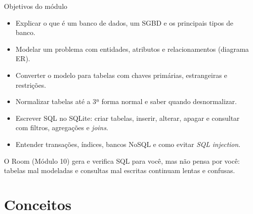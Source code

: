 \documentclass[aspectratio=169,10pt]{beamer}
\begin{document}
\capa

\begin{frame}{Objetivos do módulo}
  \begin{conceito}
    \begin{itemize}
      \item Explicar o que é um banco de dados, um SGBD e os principais tipos de banco.
      \item Modelar um problema com entidades, atributos e relacionamentos (diagrama ER).
      \item Converter o modelo para tabelas com chaves primárias, estrangeiras e restrições.
      \item Normalizar tabelas até a 3ª forma normal e saber quando desnormalizar.
      \item Escrever SQL no SQLite: criar tabelas, inserir, alterar, apagar e consultar com filtros, agregações e \emph{joins}.
      \item Entender transações, índices, bancos NoSQL e como evitar \emph{SQL injection}.
    \end{itemize}
  \end{conceito}
  \begin{dica}
    O Room (Módulo 10) gera e verifica SQL para você, mas não pensa por você: tabelas mal modeladas e consultas mal escritas continuam lentas e confusas.
  \end{dica}
\end{frame}

\sumario

\section{Conceitos}
\end{document}
